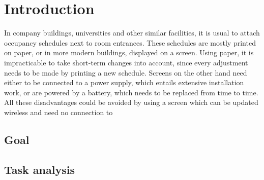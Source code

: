 \chapter{Introduction}
In company buildings, universities and other similar facilities, it is usual to attach occupancy schedules next to room entrances.
These schedules are mostly printed on paper, or in more modern buildings, displayed on a screen.
Using paper, it is impracticable to take short-term changes into account, since every adjustment needs to be made by printing a new schedule.
Screens on the other hand need either to be connected to a power supply, which entails extensive installation work, or are powered by a battery, which needs to be replaced from time to time.
All these disadvantages could be avoided by using a screen which can be updated wireless and need no connection to 




\section{Goal}

\section{Task analysis}
